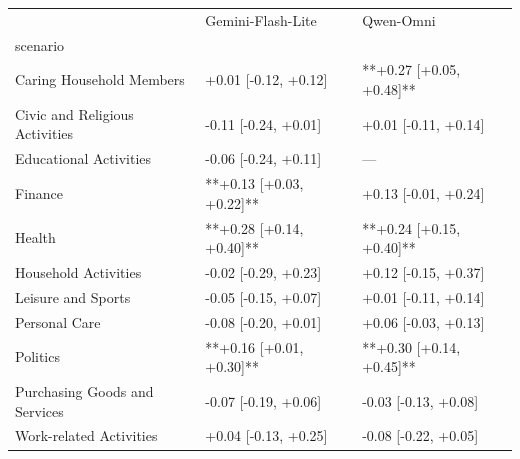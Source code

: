 \begin{tabular}{lll}
\toprule
 & Gemini-Flash-Lite & Qwen-Omni \\
scenario &  &  \\
\midrule
Caring Household Members & +0.01 [-0.12, +0.12] & **+0.27 [+0.05, +0.48]** \\
Civic and Religious Activities & -0.11 [-0.24, +0.01] & +0.01 [-0.11, +0.14] \\
Educational Activities & -0.06 [-0.24, +0.11] & — \\
Finance & **+0.13 [+0.03, +0.22]** & +0.13 [-0.01, +0.24] \\
Health & **+0.28 [+0.14, +0.40]** & **+0.24 [+0.15, +0.40]** \\
Household Activities & -0.02 [-0.29, +0.23] & +0.12 [-0.15, +0.37] \\
Leisure and Sports & -0.05 [-0.15, +0.07] & +0.01 [-0.11, +0.14] \\
Personal Care & -0.08 [-0.20, +0.01] & +0.06 [-0.03, +0.13] \\
Politics & **+0.16 [+0.01, +0.30]** & **+0.30 [+0.14, +0.45]** \\
Purchasing Goods and Services & -0.07 [-0.19, +0.06] & -0.03 [-0.13, +0.08] \\
Work-related Activities & +0.04 [-0.13, +0.25] & -0.08 [-0.22, +0.05] \\
\bottomrule
\end{tabular}
